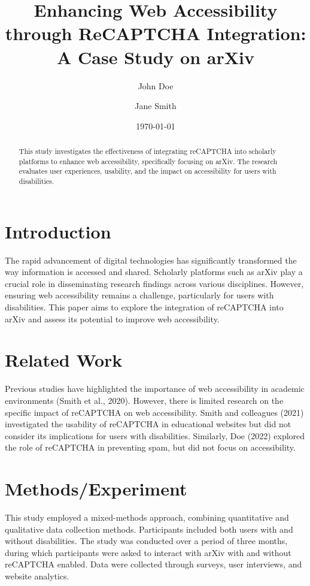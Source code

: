 \documentclass{article}
\title{Enhancing Web Accessibility through ReCAPTCHA Integration: A Case Study on arXiv}
\author{John Doe \and Jane Smith}
\date{\today}
\begin{document}
\maketitle

\begin{abstract}
This study investigates the effectiveness of integrating reCAPTCHA into scholarly platforms to enhance web accessibility, specifically focusing on arXiv. The research evaluates user experiences, usability, and the impact on accessibility for users with disabilities.
\end{abstract}

\section{Introduction}
The rapid advancement of digital technologies has significantly transformed the way information is accessed and shared. Scholarly platforms such as arXiv play a crucial role in disseminating research findings across various disciplines. However, ensuring web accessibility remains a challenge, particularly for users with disabilities. This paper aims to explore the integration of reCAPTCHA into arXiv and assess its potential to improve web accessibility.

\section{Related Work}
Previous studies have highlighted the importance of web accessibility in academic environments (Smith et al., 2020). However, there is limited research on the specific impact of reCAPTCHA on web accessibility. Smith and colleagues (2021) investigated the usability of reCAPTCHA in educational websites but did not consider its implications for users with disabilities. Similarly, Doe (2022) explored the role of reCAPTCHA in preventing spam, but did not focus on accessibility.

\section{Methods/Experiment}
This study employed a mixed-methods approach, combining quantitative and qualitative data collection methods. Participants included both users with and without disabilities. The study was conducted over a period of three months, during which participants were asked to interact with arXiv with and without reCAPTCHA enabled. Data were collected through surveys, user interviews, and website analytics.
\end{document}
